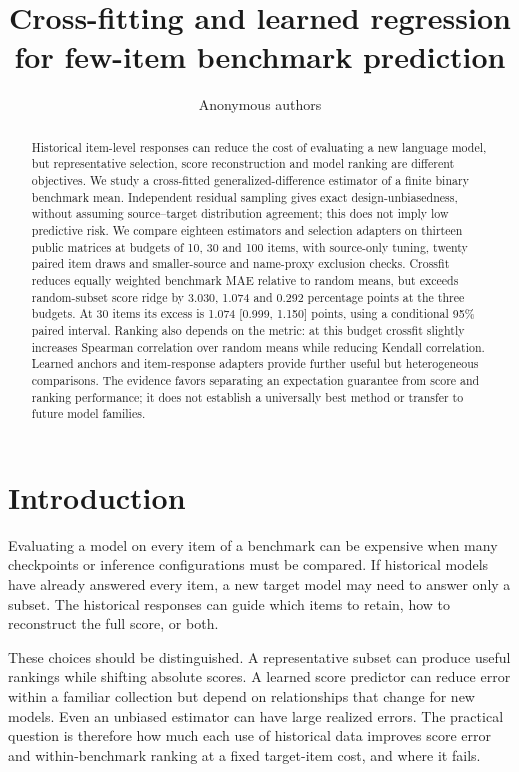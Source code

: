 \documentclass{article}
\title{Cross-fitting and learned regression\\for few-item benchmark prediction}
\author{Anonymous authors}
\begin{document}
\maketitle
\begin{abstract}
Historical item-level responses can reduce the cost of evaluating a new language model, but representative selection, score reconstruction and model ranking are different objectives. We study a cross-fitted generalized-difference estimator of a finite binary benchmark mean. Independent residual sampling gives exact design-unbiasedness, without assuming source--target distribution agreement; this does not imply low predictive risk. We compare eighteen estimators and selection adapters on thirteen public matrices at budgets of 10, 30 and 100 items, with source-only tuning, twenty paired item draws and smaller-source and name-proxy exclusion checks. Crossfit reduces equally weighted benchmark MAE relative to random means, but exceeds random-subset score ridge by 3.030, 1.074 and 0.292 percentage points at the three budgets. At 30 items its excess is 1.074 [0.999, 1.150] points, using a conditional 95\% paired interval. Ranking also depends on the metric: at this budget crossfit slightly increases Spearman correlation over random means while reducing Kendall correlation. Learned anchors and item-response adapters provide further useful but heterogeneous comparisons. The evidence favors separating an expectation guarantee from score and ranking performance; it does not establish a universally best method or transfer to future model families.
\end{abstract}

\section{Introduction}
Evaluating a model on every item of a benchmark can be expensive when many checkpoints or inference configurations must be compared. If historical models have already answered every item, a new target model may need to answer only a subset. The historical responses can guide which items to retain, how to reconstruct the full score, or both.

These choices should be distinguished. A representative subset can produce useful rankings while shifting absolute scores. A learned score predictor can reduce error within a familiar collection but depend on relationships that change for new models. Even an unbiased estimator can have large realized errors. The practical question is therefore how much each use of historical data improves score error and within-benchmark ranking at a fixed target-item cost, and where it fails.
\end{document}
